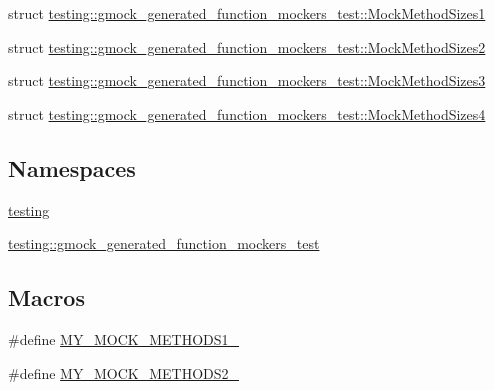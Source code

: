 \begin{DoxyCompactItemize}
\item 
struct \mbox{\hyperlink{structtesting_1_1gmock__generated__function__mockers__test_1_1_mock_method_sizes1}{testing\+::gmock\+\_\+generated\+\_\+function\+\_\+mockers\+\_\+test\+::\+Mock\+Method\+Sizes1}}
\item 
struct \mbox{\hyperlink{structtesting_1_1gmock__generated__function__mockers__test_1_1_mock_method_sizes2}{testing\+::gmock\+\_\+generated\+\_\+function\+\_\+mockers\+\_\+test\+::\+Mock\+Method\+Sizes2}}
\item 
struct \mbox{\hyperlink{structtesting_1_1gmock__generated__function__mockers__test_1_1_mock_method_sizes3}{testing\+::gmock\+\_\+generated\+\_\+function\+\_\+mockers\+\_\+test\+::\+Mock\+Method\+Sizes3}}
\item 
struct \mbox{\hyperlink{structtesting_1_1gmock__generated__function__mockers__test_1_1_mock_method_sizes4}{testing\+::gmock\+\_\+generated\+\_\+function\+\_\+mockers\+\_\+test\+::\+Mock\+Method\+Sizes4}}
\end{DoxyCompactItemize}
\subsection*{Namespaces}
\begin{DoxyCompactItemize}
\item 
 \mbox{\hyperlink{namespacetesting}{testing}}
\item 
 \mbox{\hyperlink{namespacetesting_1_1gmock__generated__function__mockers__test}{testing\+::gmock\+\_\+generated\+\_\+function\+\_\+mockers\+\_\+test}}
\end{DoxyCompactItemize}
\subsection*{Macros}
\begin{DoxyCompactItemize}
\item 
\#define \mbox{\hyperlink{_obj__test_2lib_2googletest-master_2googlemock_2test_2gmock-generated-function-mockers__test_8cc_a9ae68063487fddb9f678e66728fae155}{M\+Y\+\_\+\+M\+O\+C\+K\+\_\+\+M\+E\+T\+H\+O\+D\+S1\+\_\+}}
\item 
\#define \mbox{\hyperlink{_obj__test_2lib_2googletest-master_2googlemock_2test_2gmock-generated-function-mockers__test_8cc_ac36252ad7584222cebc036d56465d652}{M\+Y\+\_\+\+M\+O\+C\+K\+\_\+\+M\+E\+T\+H\+O\+D\+S2\+\_\+}}
\end{DoxyCompactItemize}
